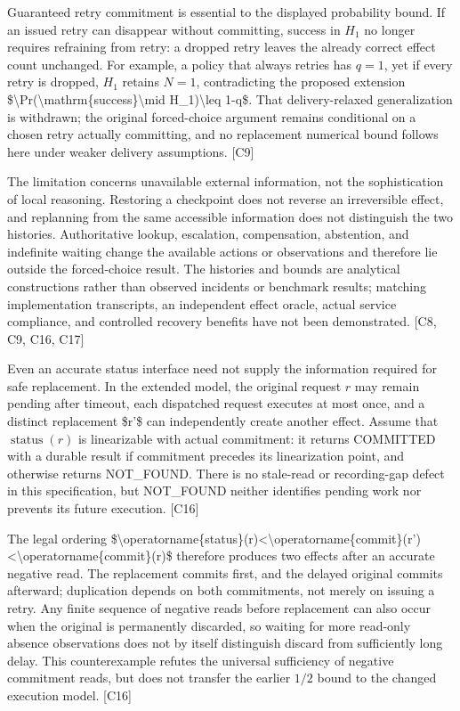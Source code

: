 \documentclass[11pt]{article}
\begin{document}
Guaranteed retry commitment is essential to the displayed probability bound. If an issued retry can disappear without committing, success in $H_1$ no longer requires refraining from retry: a dropped retry leaves the already correct effect count unchanged. For example, a policy that always retries has $q=1$, yet if every retry is dropped, $H_1$ retains $N=1$, contradicting the proposed extension \$\textbackslash{}Pr(\textbackslash{}mathrm\{success\}\textbackslash{}mid H\_1)\textbackslash{}leq 1-q\$. That delivery-relaxed generalization is withdrawn; the original forced-choice argument remains conditional on a chosen retry actually committing, and no replacement numerical bound follows here under weaker delivery assumptions. [C9]

The limitation concerns unavailable external information, not the sophistication of local reasoning. Restoring a checkpoint does not reverse an irreversible effect, and replanning from the same accessible information does not distinguish the two histories. Authoritative lookup, escalation, compensation, abstention, and indefinite waiting change the available actions or observations and therefore lie outside the forced-choice result. The histories and bounds are analytical constructions rather than observed incidents or benchmark results; matching implementation transcripts, an independent effect oracle, actual service compliance, and controlled recovery benefits have not been demonstrated. [C8, C9, C16, C17]

Even an accurate status interface need not supply the information required for safe replacement. In the extended model, the original request $r$ may remain pending after timeout, each dispatched request executes at most once, and a distinct replacement \$r'\$ can independently create another effect. Assume that $\operatorname{status}(r)$ is linearizable with actual commitment: it returns COMMITTED with a durable result if commitment precedes its linearization point, and otherwise returns NOT\_\allowbreak{}FOUND. There is no stale-read or recording-gap defect in this specification, but NOT\_\allowbreak{}FOUND neither identifies pending work nor prevents its future execution. [C16]

The legal ordering \$\textbackslash{}operatorname\{status\}(r)\textless{}\textbackslash{}operatorname\{commit\}(r')\textless{}\textbackslash{}operatorname\{commit\}(r)\$ therefore produces two effects after an accurate negative read. The replacement commits first, and the delayed original commits afterward; duplication depends on both commitments, not merely on issuing a retry. Any finite sequence of negative reads before replacement can also occur when the original is permanently discarded, so waiting for more read-only absence observations does not by itself distinguish discard from sufficiently long delay. This counterexample refutes the universal sufficiency of negative commitment reads, but does not transfer the earlier $1/2$ bound to the changed execution model. [C16]
\end{document}

